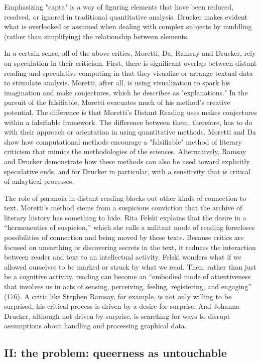 \documentclass[11pt]{article}
\begin{document}
Emphasizing "capta" is a way of figuring elements that have been
reduced, resolved, or ignored in traditional quantitative
analysis. Drucker makes evident what is overlooked or assumed when
dealing with complex subjects by muddling (rather than simplifying)
the relationship between elements.

In a certain sense, all of the above critics, Moretti, Da, Ramsay and
Drucker, rely on speculation in their criticism. First, there is
significant overlap between distant reading and speculative computing
in that they visualize or arrange textual data to stimulate
analysis. Moretti, after all, is using visualization to spark his
imagination and make conjectures, which he describes as
"explanations." In the pursuit of the falsifiable, Moretti evacuates
much of his method's creative potential. The difference is that
Moretti's Distant Reading uses makes conjectures within a falsifiable
framework. The difference between them, therefore, has to do with
their approach or orientation in using quantitative methods. Moretti
and Da show how computational methods encourage a "falsifiable" method
of literary criticism that mimics the methodologies of the
sciences. Alternatively, Ramsay and Drucker demonstrate how these
methods can also be used toward explicitly speculative ends, and for
Drucker in particular, with a sensitivity that is critical of
anlaytical processes.

The role of paranoia in distant reading blocks out other kinds of
connection to text. Moretti's method stems from a suspicious
conviction that the archive of literary history has something to
hide. Rita Felski explains that the desire in a “hermeneutics of
suspicion,” which she calls a militant mode of reading forecloses
possibilities of connection and being moved by these texts. Because
critics are focused on unearthing or discovering secrets in the text,
it reduces the interaction between reader and text to an intellectual
activity. Felski wonders what if we allowed ourselves to be marked or
struck by what we read. Then, rather than just be a cognitive
activity, reading can become an “embodied mode of attentiveness that
involves us in acts of sensing, perceiving, feeling, registering, and
engaging” (176). A critic like Stephen Ramsay, for example, is not
only willing to be surprised, his critical process is driven by a
desire for surprise. And Johanna Drucker, although not driven by
surprise, is searching for ways to disrupt assumptions about handling
and processing graphical data.


\subsection{II: the problem: queerness as untouchable}
\label{sec:org2764ec0}
\end{document}
